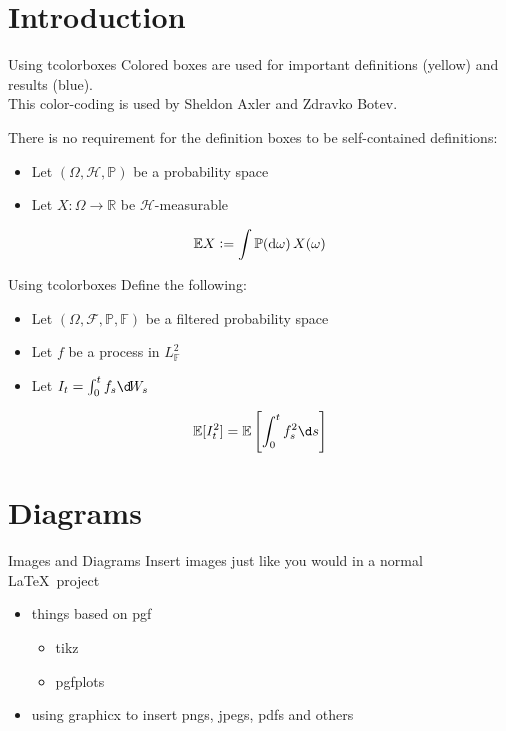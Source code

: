 
\section{Introduction}
\begin{frame}{Using tcolorboxes}
  Colored boxes are used for important definitions (yellow) and results (blue).\\
  This color-coding is used by Sheldon Axler and Zdravko Botev.

  \vspace{1cm}

  There is no requirement for the definition boxes to be self-contained definitions:
  \begin{itemize}
    \item Let $(\Omega, \mathcal H, \mathbb P)$ be a probability space
    \item Let $X:\Omega\to \mathbb R$ be $\mathcal H$-measurable
  \end{itemize}

  \begin{sqt:definition}
    $$\mathbb E X := \int \mathbb P(\dif \omega)\, X(\omega) $$
  \end{sqt:definition}
\end{frame}

\begin{frame}{Using tcolorboxes}
  Define the following:
  \begin{itemize}
    \item Let $(\Omega,\mathcal F, \mathbb P, \mathbb F)$ be a filtered probability space
    \item Let $f$ be a process in $L^2_{\mathbb F}$
    \item Let $I_t=\int_0^t f_s\d\!W_s$
  \end{itemize}
  \begin{sqt:result}
    $$\mathbb E[I_t^2] = \mathbb E\left[\int_0^t f^2_s\d s\right]$$
  \end{sqt:result}
\end{frame}

\section{Diagrams}

\begin{frame}{Images and Diagrams}
  Insert images just like you would in a normal \LaTeX\ project
  \begin{itemize}
    \item things based on pgf
    \begin{itemize}
      \item tikz
      \item pgfplots
    \end{itemize}
    \item using graphicx to insert pngs, jpegs, pdfs and others
  \end{itemize}
\end{frame}

